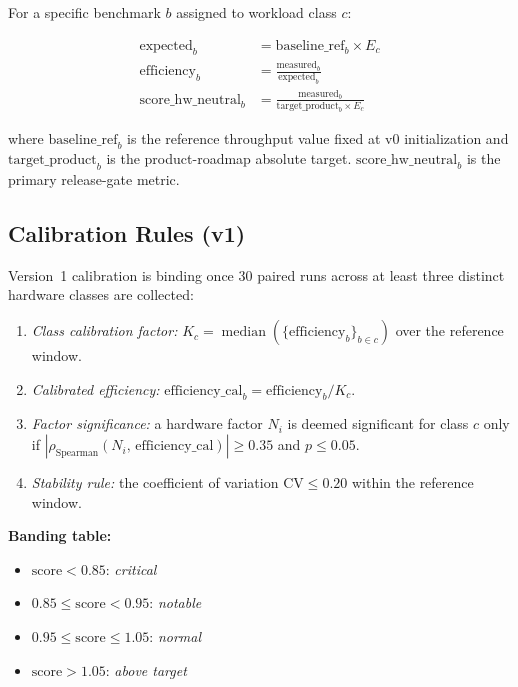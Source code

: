 \documentclass[conference]{IEEEtran}
\begin{document}
For a specific benchmark $b$ assigned to workload class $c$:

\begin{align}
  \text{expected}_{b}  &= \text{baseline\_ref}_{b} \times E_c \\
  \text{efficiency}_{b} &= \frac{\text{measured}_{b}}{\text{expected}_{b}} \\
  \text{score\_hw\_neutral}_{b} &=
        \frac{\text{measured}_{b}}{\text{target\_product}_{b} \times E_c}
\end{align}

\noindent
where \(\text{baseline\_ref}_{b}\) is the reference throughput value
fixed at v0 initialization and \(\text{target\_product}_{b}\) is the
product-roadmap absolute target.
\(\text{score\_hw\_neutral}_{b}\) is the primary release-gate metric.

\subsection{Calibration Rules (v1)}
\label{ssec:calibration}

Version~1 calibration is binding once 30 paired runs across at least
three distinct hardware classes are collected:

\begin{enumerate}
  \item \emph{Class calibration factor:}
        $K_c = \operatorname{median}(\{\text{efficiency}_{b}\}_{b \in c})$
        over the reference window.
  \item \emph{Calibrated efficiency:}
        $\text{efficiency\_cal}_{b} = \text{efficiency}_{b} / K_c$.
  \item \emph{Factor significance:} a hardware factor $N_i$ is deemed
        significant for class $c$ only if
        $|\rho_{\text{Spearman}}(N_i,\,\text{efficiency\_cal})| \geq 0.35$
        and $p \leq 0.05$.
  \item \emph{Stability rule:} the coefficient of variation
        $\text{CV} \leq 0.20$ within the reference window.
\end{enumerate}

\noindent
\textbf{Banding table:}
\begin{itemize}
  \item $\text{score} < 0.85$: \emph{critical}
  \item $0.85 \leq \text{score} < 0.95$: \emph{notable}
  \item $0.95 \leq \text{score} \leq 1.05$: \emph{normal}
  \item $\text{score} > 1.05$: \emph{above target}
\end{itemize}
\end{document}
